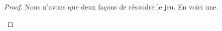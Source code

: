  \label{config-1-1}

	
\begin{proof}
	Nous n'avons que deux façons de résoudre le jeu. En voici une.
	\begin{mvts}
		\medskip
		\item  {}
		  
		\medskip
		\item  {}
		  
		\medskip
		\item  {}
		  
		\medskip
		\item  {}
	\end{mvts}
\end{proof}

